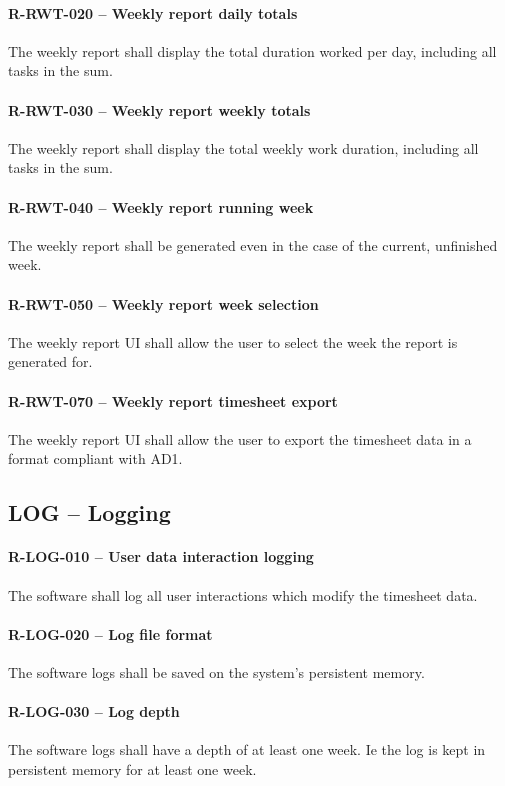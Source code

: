 \paragraph{R-RWT-020 -- Weekly report daily totals}
The weekly report shall display the total duration worked per day, including
all tasks in the sum.

\paragraph{R-RWT-030 -- Weekly report weekly totals}
The weekly report shall display the total weekly work duration, including
all tasks in the sum.

\paragraph{R-RWT-040 -- Weekly report running week}
The weekly report shall be generated even in the case of the current, unfinished
week.

\paragraph{R-RWT-050 -- Weekly report week selection}
The weekly report UI shall allow the user to select the week the report is
generated for.

\paragraph{R-RWT-070 -- Weekly report timesheet export}
The weekly report UI shall allow the user to export the timesheet data in
a format compliant with AD1.

\subsection{LOG -- Logging}
\paragraph{R-LOG-010 -- User data interaction logging}
The software shall log all user interactions which modify the timesheet
data.

\paragraph{R-LOG-020 -- Log file format}
The software logs shall be saved on the system's persistent memory.

\paragraph{R-LOG-030 -- Log depth}
The software logs shall have a depth of at least one week. Ie the
log is kept in persistent memory for at least one week.

